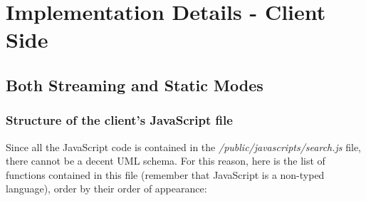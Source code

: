 \documentclass[a4paper,11pt]{report}
\begin{document}
\section{Implementation Details - Client Side}
\subsection{Both Streaming and Static Modes}
\subsubsection{Structure of the client's JavaScript file}
Since all the JavaScript code is contained in the \emph{/public/javascripts/search.js} file, there cannot be a decent UML schema. For this reason, here is the list of functions contained in this file (remember that JavaScript is a non-typed language), order by their order of appearance:
\end{document}
